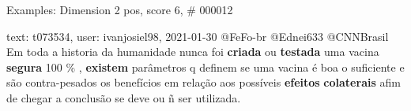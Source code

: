 \begin{frame}{Examples: Dimension 2 pos, score 6, \# 000012}
\footnotesize
\begin{exampleblock}{text: t073534, user: ivanjosiel98, 2021-01-30}
@FeFo-br @Ednei633 @CNNBrasil Em toda a historia da humanidade nunca foi 
\textbf{criada} ou \textbf{testada} uma vacina \textbf{segura} 100 \% , 
\textbf{existem} parâmetros q definem se uma vacina é boa o suficiente e são 
contra-pesados os benefícios em relação aos possíveis \textbf{efeitos} 
\textbf{colaterais} afim de chegar a conclusão se deve ou ñ ser utilizada. 
\end{exampleblock}
\end{frame}
